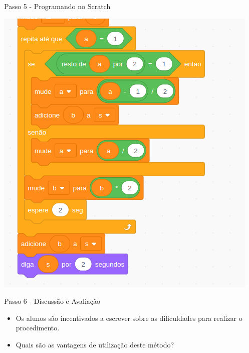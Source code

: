 \documentclass{beamer}
\begin{document}
\begin{frame}{Passo 5 - Programando no Scratch}



\begin{center}
	\includegraphics[scale=0.4]{images/scratch.png} 
\end{center}



\end{frame}


\begin{frame}{Passo 6 - Discussão e Avaliação}

\begin{itemize}

\item<1-> Os alunos são incentivados a escrever sobre as dificuldades para realizar o procedimento.

\item<2-> Quais são as vantagens de utilização deste método?


\end{itemize}


\end{frame}
\end{document}
